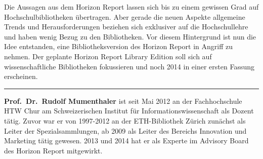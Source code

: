 \documentclass[a4paper,
fontsize=11pt,
oneside,
numbers=noperiodatend,
parskip=half-,
bibliography=totoc,
final
]{scrartcl}
\begin{document}
Die Aussagen aus dem Horizon Report lassen sich bis zu einem gewissen
Grad auf Hochschulbibliotheken übertragen. Aber gerade die neuen Aspekte
allgemeine Trends und Herausforderungen beziehen sich exklusiver auf die
Hochschullehre und haben wenig Bezug zu den Bibliotheken. Vor diesem
Hintergrund ist nun die Idee entstanden, eine Bibliotheksversion des
Horizon Report in Angriff zu nehmen. Der geplante Horizon Report Library
Edition soll sich auf wissenschaftliche Bibliotheken fokussieren und
noch 2014 in einer ersten Fassung erscheinen.

\begin{center}\rule{3in}{0.4pt}\end{center}

\textbf{Prof.~Dr.~Rudolf Mumenthaler} ist seit Mai 2012 an der
Fachhochschule HTW Chur am Schweizerischen Institut für
Informationswissenschaft als Dozent tätig. Zuvor war er von 1997-2012 an
der ETH-Bibliothek Zürich zunächst als Leiter der Spezialsammlungen, ab
2009 als Leiter des Bereichs Innovation und Marketing tätig gewesen.
2013 und 2014 hat er als Experte im Advisory Board des Horizon Report
mitgewirkt.
\end{document}
